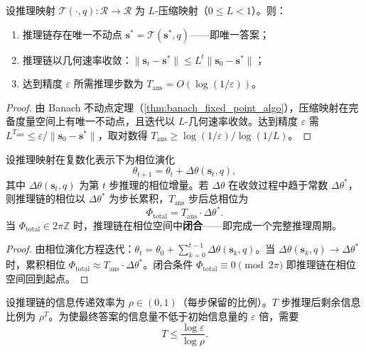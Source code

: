 \begin{theorem}[推理的迭代闭合条件]\label{thm:reasoning_fixed_point}
设推理映射 $\mathcal{T}(\cdot,q):\mathcal{R}\to\mathcal{R}$ 为 $L$-压缩映射（$0\le L<1$）。则：
\begin{enumerate}[label=(\roman*)]
    \item 推理链存在唯一不动点 $\mathbf{s}^*=\mathcal{T}(\mathbf{s}^*,q)$——即唯一答案；
    \item 推理链以几何速率收敛：$\|\mathbf{s}_t-\mathbf{s}^*\|\le L^t\|\mathbf{s}_0-\mathbf{s}^*\|$；
    \item 达到精度 $\varepsilon$ 所需推理步数为 $T_{\text{ans}}=O(\log(1/\varepsilon))$。
\end{enumerate}
\end{theorem}

\begin{proof}
由 Banach 不动点定理（\cref{thm:banach_fixed_point_algo}），压缩映射在完备度量空间上有唯一不动点，且迭代以 $L$-几何速率收敛。达到精度 $\varepsilon$ 需 $L^{T_{\text{ans}}}\le\varepsilon/\|\mathbf{s}_0-\mathbf{s}^*\|$，取对数得 $T_{\text{ans}}\ge\log(1/\varepsilon)/\log(1/L)$。
\end{proof}

\begin{proposition}[多步推理的相位累积]\label{prop:reasoning_phase_accumulation}
设推理映射在复数化表示下为相位演化
\[
\theta_{t+1}=\theta_t+\Delta\theta(\mathbf{s}_t,q),
\]
其中 $\Delta\theta(\mathbf{s}_t,q)$ 为第 $t$ 步推理的相位增量。若 $\Delta\theta$ 在收敛过程中趋于常数 $\Delta\theta^*$，则推理链的相位以 $\Delta\theta^*$ 为步长累积，$T_{\text{ans}}$ 步后总相位为
\[
\Phi_{\text{total}}=T_{\text{ans}}\cdot\Delta\theta^*.
\]
当 $\Phi_{\text{total}}\in2\pi\mathbb{Z}$ 时，推理链在相位空间中\textbf{闭合}——即完成一个完整推理周期。
\end{proposition}

\begin{proof}
由相位演化方程迭代：$\theta_t=\theta_0+\sum_{k=0}^{t-1}\Delta\theta(\mathbf{s}_k,q)$。当 $\Delta\theta(\mathbf{s}_k,q)\to\Delta\theta^*$ 时，累积相位 $\Phi_{\text{total}}\approx T_{\text{ans}}\cdot\Delta\theta^*$。闭合条件 $\Phi_{\text{total}}\equiv0\pmod{2\pi}$ 即推理链在相位空间回到起点。
\end{proof}

\begin{lemma}[推理链深度与信息传递]\label{lem:reasoning_depth_information}
设推理链的信息传递效率为 $\rho\in(0,1)$（每步保留的比例）。$T$ 步推理后剩余信息比例为 $\rho^T$。为使最终答案的信息量不低于初始信息量的 $\varepsilon$ 倍，需要
\[
T\le\frac{\log\varepsilon}{\log\rho}.
\]
\end{lemma}


